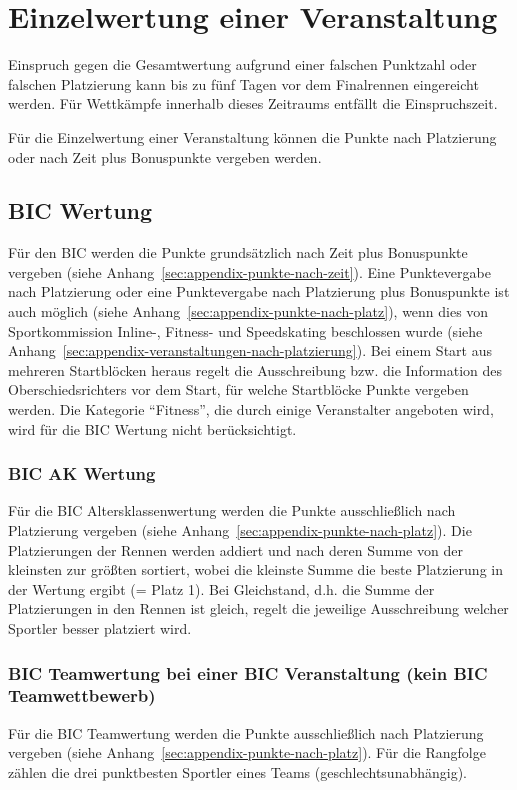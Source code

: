 \section{Einzelwertung einer Veranstaltung}
Einspruch gegen die Gesamtwertung aufgrund einer falschen Punktzahl oder falschen Platzierung kann bis zu fünf Tagen vor dem Finalrennen eingereicht werden. Für Wettkämpfe innerhalb dieses Zeitraums entfällt die Einspruchszeit.

Für die Einzelwertung einer Veranstaltung können die Punkte nach Platzierung oder nach Zeit plus Bonuspunkte vergeben werden.

\subsection{BIC Wertung}
Für den BIC werden die Punkte grundsätzlich nach Zeit plus Bonuspunkte vergeben (siehe Anhang~\ref{sec:appendix-punkte-nach-zeit}). Eine Punktevergabe nach Platzierung oder eine Punktevergabe nach Platzierung plus Bonuspunkte ist auch möglich (siehe Anhang~\ref{sec:appendix-punkte-nach-platz}), wenn dies von Sportkommission Inline-, Fitness- und Speedskating beschlossen wurde (siehe Anhang~\ref{sec:appendix-veranstaltungen-nach-platzierung}). Bei einem Start aus mehreren Startblöcken heraus regelt die Ausschreibung bzw. die Information des Oberschiedsrichters vor dem Start, für welche Startblöcke Punkte vergeben werden. Die Kategorie “Fitness”, die durch einige Veranstalter angeboten wird, wird für die BIC Wertung nicht berücksichtigt.

\subsubsection{BIC AK Wertung}
Für die BIC Altersklassenwertung werden die Punkte ausschließlich nach Platzierung vergeben (siehe Anhang~\ref{sec:appendix-punkte-nach-platz}). Die Platzierungen der Rennen werden addiert und nach deren Summe von der kleinsten zur größten sortiert, wobei die kleinste Summe die beste Platzierung in der Wertung ergibt (= Platz 1). Bei Gleichstand, d.h. die Summe der Platzierungen in den Rennen ist gleich, regelt die jeweilige Ausschreibung welcher  Sportler besser platziert wird.

\subsubsection{BIC Teamwertung bei einer BIC Veranstaltung (kein BIC Teamwettbewerb)}
Für die BIC Teamwertung werden die Punkte ausschließlich nach Platzierung vergeben (siehe Anhang~\ref{sec:appendix-punkte-nach-platz}). Für die Rangfolge zählen die drei punktbesten Sportler eines Teams (geschlechtsunabhängig).

